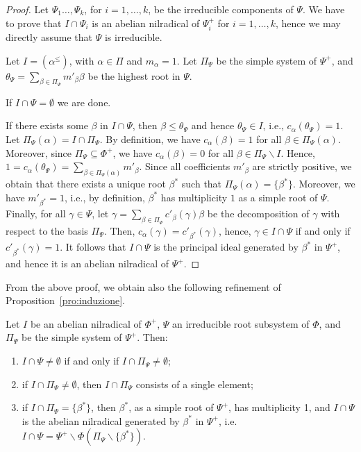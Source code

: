 \documentclass[ALCO,published]{cedram}
\theoremstyle{plain}
\newcommand\smeno{\smallsetminus}
\newcommand\al{\alpha}
\newcommand\be{\beta}
\newcommand\ga{\gamma}
\renewcommand{\leq}{\leqslant}
\begin{document}
\begin{proof}
Let $\Psi_1\dots, \Psi_k$,  for $i=1, \dots, k$, be the irreducible components of $\Psi$.
We have to prove that $I\cap \Psi_i$ is an abelian nilradical of $\Psi_i^+$ for $i=1, \dots, k$, hence we may directly assume 
that $\Psi$ is irreducible.
\par
Let $I=(\al^\leq) $, with $\al\in \Pi$ and $m_\al=1$.  
Let $\Pi_{\Psi}$ be the simple system of $\Psi^+$, and $\theta_\Psi=\sum_{\be\in \Pi_\Psi}m'_\be\be$ be the highest root in $\Psi$. 

\par
If $I\cap \Psi=\emptyset$  we are done.

\par
If there exists some $\be$ in $I\cap \Psi$, then $\be\leq \theta_\Psi$ and hence $\theta_\Psi\in I$, i.e., $c_\al(\theta_\Psi)=1$. Let $\Pi_\Psi(\al)=I\cap \Pi_\Psi$. 
By definition, we have $c_\al(\be)=1$ for all $\be\in \Pi_\Psi(\al)$.
Moreover, since $\Pi_{\Psi}\subseteq \Phi^+$, we have $c_\al(\be)=0$ for all $\be\in \Pi_{\Psi}\smeno I$. 
Hence,  $1=c_\al(\theta_\Psi)=\sum_{\be\in\Pi_{\Psi}(\al)} m'_\be$.
Since all coefficients $m'_\be$ are strictly positive, we obtain that there exists a unique root $\be^*$ such that  $\Pi_{\Psi}(\al)=\{\be^*\}$. 
Moreover, we have $m'_{\be^*}=1$, i.e.,  by definition, $\be^*$ has multiplicity $1$ as a simple root of $\Psi$.
Finally, for all $\ga\in \Psi$, let $\ga=\sum_{\be\in \Pi_\Psi}c'_\be(\ga)\be$ be the decomposition of $\ga$ with respect to the basis $\Pi_\Psi$. 
Then, $c_\al(\ga)=c'_{\be^*}(\ga)$, hence, $\ga\in I\cap\Psi$ if and only if $c'_{\be^*}(\ga)=1$.
It follows that $I\cap\Psi$ is the principal ideal generated by $\be^*$ in $\Psi^+$, and hence it is an abelian nilradical of $\Psi^+$.
\end{proof}

From the above proof, we obtain also the following refinement of Proposition~\ref{pro:induzione}. 

\begin{pro}\label{pro:induzione-fine}
Let $I$ be an abelian nilradical of $\Phi^+$, $\Psi$ an irreducible root subsystem of $\Phi$, and $\Pi_\Psi$ be the simple system of $\Psi^+$. Then:
\begin{enumerate}
\item 
$I\cap \Psi\neq \emptyset$ if and only if $I\cap \Pi_\Psi\neq \emptyset$; 
\label{itm:nonvuoto}
\item 
if $I\cap \Pi_\Psi\neq \emptyset$, then $I\cap \Pi_\Psi$  consists of a single element;
\label{itm:singleton}
\item
if $I\cap\Pi_\Psi=\{\beta^*\}$, then $\beta^*$, as a simple root of $\Psi^+$, has multiplicity 1, and $I\cap \Psi$ is the abelian nilradical generated by $\beta^*$ in $\Psi^+$, i.e. $I\cap \Psi=\Psi^+\smeno \Phi(\Pi_\Psi\smeno\{\beta^*\})$.
\label{itm:nilradical}
\end{enumerate}
\end{pro}
\end{document}
